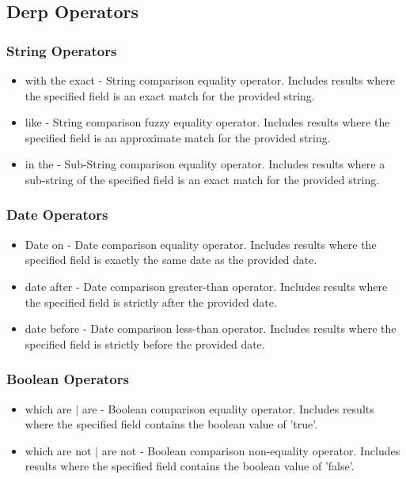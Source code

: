 \subsection{Derp Operators}
\subsubsection{String Operators}
\begin{itemize}
\item with the exact - String comparison equality operator. Includes results where the specified field is an exact match for the provided string.
\item like - String comparison fuzzy equality operator. Includes results where the specified field is an approximate match for the provided string.
\item in the - Sub-String comparison equality operator. Includes results where a sub-string of the specified field is an exact match for the provided string.
\end{itemize}
\subsubsection{Date Operators}
\begin{itemize}
\item Date on - Date comparison equality operator. Includes results where the specified field is exactly the same date as the provided date.
\item date after - Date comparison greater-than operator. Includes results where the specified field is strictly after the provided date.
\item date before - Date comparison less-than operator. Includes results where the specified field is strictly before the provided date.
\end{itemize}
\subsubsection{Boolean Operators}
\begin{itemize}
\item which are $|$ are - Boolean comparison equality operator. Includes results where the specified field contains the boolean value of 'true'.
\item which are not $|$ are not - Boolean comparison non-equality operator. Includes results where the specified field contains the boolean value of 'false'.
\end{itemize}
